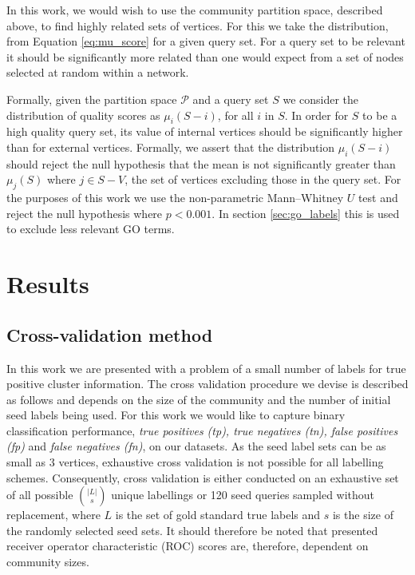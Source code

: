 \documentclass[sigconf]{acmart}
\begin{document}
In this work, we would wish to use the community partition space, described above, to find highly related sets of vertices.
For this we take the distribution, from Equation \ref{eq:mu_score} for a given query set.
For a query set to be relevant it should be significantly more related than one would expect from a set of nodes selected at random within a network.

Formally, given the partition space $\mathcal{P}$ and a query set $S$ we consider the distribution of quality scores as $\mu_i(S - i)$, for all $i$ in $S$.
In order for $S$ to be a high quality query set, its value of internal vertices should be significantly higher than for external vertices.
Formally, we assert that the distribution $\mu_i(S - i)$ should reject the null hypothesis that the mean is not significantly greater than $\mu_j(S)$ where $j \in S - V$, the set of vertices excluding those in the query set.
For the purposes of this work we use the non-parametric Mann–Whitney $U$ test and reject the null hypothesis where $p < 0.001$.
In section \ref{sec:go_labels} this is used to exclude less relevant GO terms.

\section{Results}
\subsection{Cross-validation method}
\label{sec:cross_validation}
In this work we are presented with a problem of a small number of labels for true positive cluster information.
The cross validation procedure we devise is described as follows and depends on the size of the community and the number of initial seed labels being used.
For this work we would like to capture binary classification  performance, \textit{true positives (tp), true negatives (tn), false positives (fp)} and \textit{false negatives (fn)}, on our datasets.
As the seed label sets can be as small as 3 vertices, exhaustive cross validation is not possible for all labelling schemes.
Consequently, cross validation is either conducted on an exhaustive set of all possible $\binom{|L|}{s}$ unique labellings or 120 seed queries sampled without replacement, where $L$ is the set of gold standard true labels and $s$ is the size of the randomly selected seed sets.
It should therefore be noted that presented receiver operator characteristic (ROC) scores are, therefore, dependent on community sizes.
\end{document}
